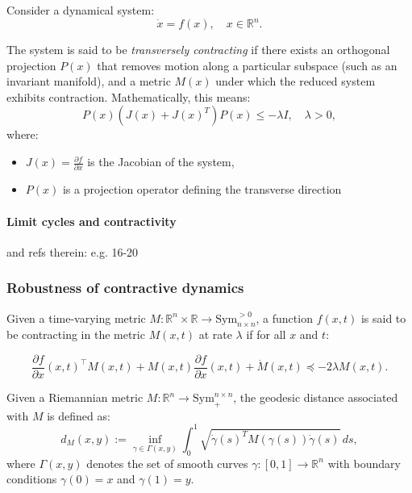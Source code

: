 \documentclass{article}
\newcounter{ct}
\begin{document}
Consider a dynamical system:
\begin{equation}
    \dot{x} = f(x), \quad x \in \mathbb{R}^n.
\end{equation}

The system is said to be \textit{transversely contracting} if there exists an orthogonal projection $P(x)$ that removes motion along a particular subspace (such as an invariant manifold), and a metric $M(x)$ under which the reduced system exhibits contraction. Mathematically, this means:
\begin{equation}
    P(x) (J(x) + J(x)^T) P(x) \leq -\lambda I, \quad \lambda > 0,
\end{equation}
where:
\begin{itemize}
    \item $J(x) = \frac{\partial f}{\partial x}$ is the Jacobian of the system,
    \item $P(x)$ is a projection operator defining the transverse direction
\end{itemize}


\paragraph{Limit cycles and contractivity}%
 \citep{manchester2014transverse} and refs therein: e.g. 16-20


\subsubsection{Robustness of contractive dynamics}\label{sec:contractive_robustness}

Given a time-varying metric \( M : \mathbb{R}^n \times \mathbb{R} \to \text{Sym}_{n \times n}^{>0} \), a function \( f(x,t) \) is said to be contracting in the metric \( M(x,t) \) at rate \( \lambda \) if for all \( x \) and \( t \):

\[
\frac{\partial f}{\partial x} (x,t)^{\top} M(x,t) + M(x,t) \frac{\partial f}{\partial x} (x,t) + \dot{M} (x,t) \preceq -2\lambda M(x,t).
\]


Given a Riemannian metric \( M: \mathbb{R}^n \to \text{Sym}_{+}^{n \times n} \), the geodesic distance associated with \( M \) is defined as:
\begin{equation}
    d_M(x, y) := \inf_{\gamma \in \Gamma(x,y)} \int_0^1 \sqrt{\dot{\gamma}(s)^T M(\gamma(s)) \dot{\gamma}(s)} \, ds,
\end{equation}
where \( \Gamma(x,y) \) denotes the set of smooth curves \( \gamma: [0,1] \to \mathbb{R}^n \) with boundary conditions \( \gamma(0) = x \) and \( \gamma(1) = y \).
\end{document}

